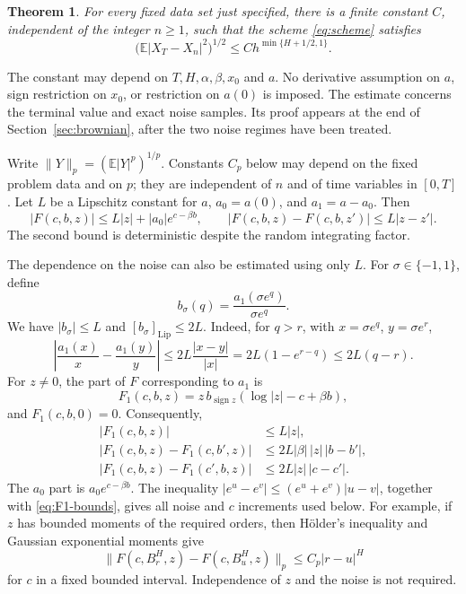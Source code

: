 \documentclass[11pt]{article}
\newtheorem{theorem}{Theorem}[section]
\theoremstyle{remark}
\newcommand{\E}{\mathbb E}
\newcommand{\norm}[1]{\lVert#1\rVert}
\newcommand{\abs}[1]{\lvert#1\rvert}
\begin{document}
\begin{theorem}\label{thm:main}
For every fixed data set just specified, there is a finite constant \(C\),
independent of the integer \(n\ge1\), such that the scheme
\eqref{eq:scheme} satisfies
\begin{equation}\label{eq:main-rate}
 \bigl(\E\abs{X_T-X_n}^2\bigr)^{1/2}
 \le C h^{\min\{H+1/2,1\}}.
\end{equation}
\end{theorem}

The constant may depend on \(T,H,\alpha,\beta,x_0\) and \(a\).
No derivative assumption on \(a\), sign restriction on \(x_0\), or
restriction on \(a(0)\) is imposed. The estimate concerns the terminal
value and exact noise samples. Its proof appears at the end of
Section~\ref{sec:brownian}, after the two noise regimes have been treated.

Write \(\norm{Y}_p=(\E\abs{Y}^p)^{1/p}\).
Constants \(C_p\) below may depend on the fixed problem data and on \(p\);
they are independent of \(n\) and of time variables in \([0,T]\).
Let \(L\) be a Lipschitz constant for \(a\), \(a_0=a(0)\), and \(a_1=a-a_0\).
Then
\begin{equation}\label{eq:basic-F}
 \abs{F(c,b,z)}\le L\abs z+\abs{a_0}e^{c-\beta b},\qquad
 \abs{F(c,b,z)-F(c,b,z')}\le L\abs{z-z'}.
\end{equation}
The second bound is deterministic despite the random integrating factor.

The dependence on the noise can also be estimated using only \(L\).
For \(\sigma\in\{-1,1\}\), define
\begin{equation}\label{eq:ratio}
 b_\sigma(q)=\frac{a_1(\sigma e^q)}{\sigma e^q}.
\end{equation}
We have \(\abs{b_\sigma}\le L\) and
\([b_\sigma]_{\mathrm{Lip}}\le2L\). Indeed, for \(q>r\),
with \(x=\sigma e^q\), \(y=\sigma e^r\),
\[
 \left|\frac{a_1(x)}x-\frac{a_1(y)}y\right|
 \le 2L\frac{\abs{x-y}}{\abs x}
 =2L(1-e^{r-q})\le2L(q-r).
\]
For \(z\ne0\), the part of \(F\) corresponding to \(a_1\) is
\begin{equation}\label{eq:F1}
 F_1(c,b,z)=z\,b_{\operatorname{sign}z}
                  (\log\abs z-c+\beta b),
\end{equation}
and \(F_1(c,b,0)=0\). Consequently,
\begin{align}
 \abs{F_1(c,b,z)}&\le L\abs z,\label{eq:F1-bounds}\\
 \abs{F_1(c,b,z)-F_1(c,b',z)}
       &\le2L\abs\beta\,\abs z\,\abs{b-b'},\nonumber\\
 \abs{F_1(c,b,z)-F_1(c',b,z)}
       &\le2L\abs z\,\abs{c-c'}.\nonumber
\end{align}
The \(a_0\) part is \(a_0e^{c-\beta b}\).
The inequality
\(\abs{e^u-e^v}\le(e^u+e^v)\abs{u-v}\), together with
\eqref{eq:F1-bounds}, gives all noise and \(c\) increments used below.
For example, if \(z\) has bounded moments of the required orders, then
H\"older's inequality and Gaussian exponential moments give
\begin{equation}\label{eq:F-noise}
 \norm{F(c,B^H_r,z)-F(c,B^H_u,z)}_p
 \le C_p\abs{r-u}^H
\end{equation}
for \(c\) in a fixed bounded interval. Independence of \(z\) and the noise
is not required.
\end{document}
